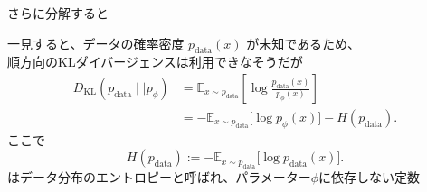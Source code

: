 \begin{frame}{さらに分解すると}
    \begin{block}{}
        一見すると、データの確率密度 \(p_{\mathrm{data}}(x)\) が未知であるため、\\
        順方向のKLダイバージェンスは利用できなそうだが
        \begin{align*}
            D_{\mathrm{KL}}(p_{\mathrm{data}}\mid\mid p_{\phi})
            &= \mathbb{E}_{x\sim p_{\mathrm{data}}}
                \left[
                    \log\frac{p_{\mathrm{data}}(x)}{p_{\phi}(x)}
                \right] \\
            &= -\mathbb{E}_{x\sim p_{\mathrm{data}}}
                \bigl[\log p_{\phi}(x)\bigr]
                - H(p_{\mathrm{data}}).
        \end{align*}
        ここで
        \[
            H(p_{\mathrm{data}})
            :=
            -\mathbb{E}_{x\sim p_{\mathrm{data}}}
            \bigl[\log p_{\mathrm{data}}(x)\bigr].
        \]
        \small はデータ分布のエントロピーと呼ばれ、パラメーター$\phi$に依存しない定数
    \end{block}
\end{frame}

